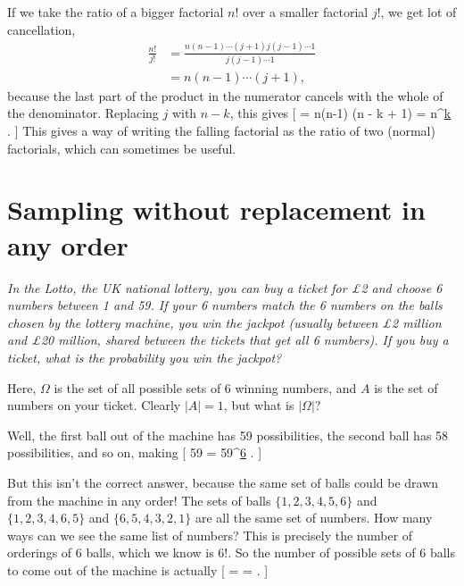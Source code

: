 \documentclass[
  letterpaper,
  DIV=11,
  numbers=noendperiod]{scrreprt}
\theoremstyle{remark}
\begin{document}
If we take the ratio of a bigger factorial \(n!\) over a smaller
factorial \(j!\), we get lot of cancellation, \begin{align*}
\frac{n!}{j!} &= \frac{n(n-1) \cdots(j+1)j(j-1) \cdots 1}{j(j-1) \cdots 1} \\
  &= n(n-1) \cdots (j+1) ,
\end{align*} because the last part of the product in the numerator
cancels with the whole of the denominator. Replacing \(j\) with \(n-k\),
this gives {[}  = n(n-1) \cdots (n - k + 1) =
{n}^{\underline{k}} . {]} This gives a way of writing the falling
factorial as the ratio of two (normal) factorials, which can sometimes
be useful.

\hypertarget{combinations}{%
\section{Sampling without replacement in any order}\label{combinations}}

\leavevmode{}%
\emph{In the Lotto, the UK national lottery, you can buy a ticket for £2
and choose 6 numbers between 1 and 59. If your 6 numbers match the 6
numbers on the balls chosen by the lottery machine, you win the jackpot
(usually between £2 million and £20 million, shared between the tickets
that get all 6 numbers). If you buy a ticket, what is the probability
you win the jackpot?}

Here, \(\Omega\) is the set of all possible sets of 6 winning numbers,
and \(A\) is the set of numbers on your ticket. Clearly \(|A| = 1\), but
what is \(|\Omega|\)?

Well, the first ball out of the machine has 59 possibilities, the second
ball has 58 possibilities, and so on, making {[} 59  
   = {59}^{\underline{6}} . {]}

But this isn't the correct answer, because the same set of balls could
be drawn from the machine in any order! The sets of balls
\(\{1,2,3,4,5,6\}\) and \(\{1,2,3,4,6,5\}\) and \(\{6,5,4,3,2,1\}\) are
all the same set of numbers. How many ways can we see the same list of
numbers? This is precisely the number of orderings of 6 balls, which we
know is \(6!\). So the number of possible sets of 6 balls to come out of
the machine is actually {[}  =
 =
  . {]}
\end{document}
